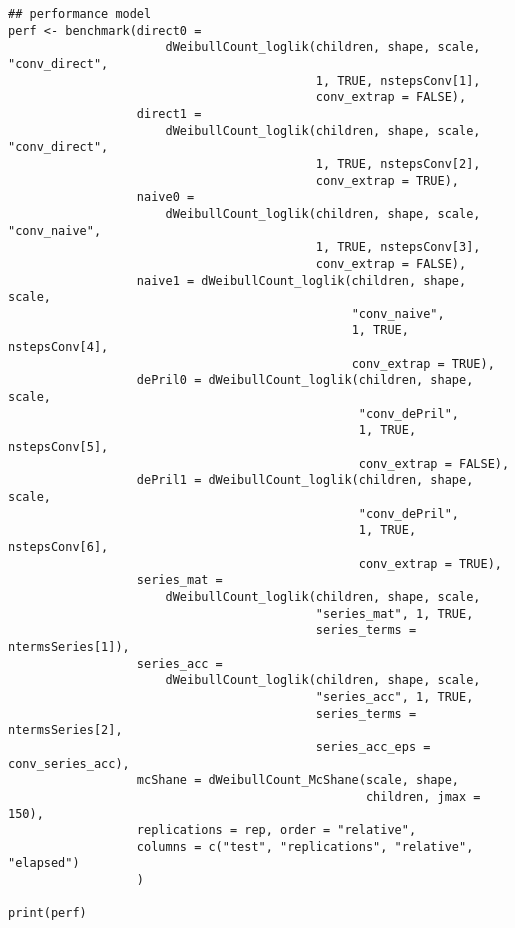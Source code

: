 \documentclass[a4paper,twoside,11pt]{article}
\begin{document}
\begin{verbatim}
## performance model
perf <- benchmark(direct0 =
                      dWeibullCount_loglik(children, shape, scale, "conv_direct",
                                           1, TRUE, nstepsConv[1],
                                           conv_extrap = FALSE),
                  direct1 =
                      dWeibullCount_loglik(children, shape, scale, "conv_direct",
                                           1, TRUE, nstepsConv[2],
                                           conv_extrap = TRUE),
                  naive0 =
                      dWeibullCount_loglik(children, shape, scale, "conv_naive",
                                           1, TRUE, nstepsConv[3],
                                           conv_extrap = FALSE),
                  naive1 = dWeibullCount_loglik(children, shape, scale,
                                                "conv_naive",
                                                1, TRUE, nstepsConv[4],
                                                conv_extrap = TRUE),
                  dePril0 = dWeibullCount_loglik(children, shape, scale,
                                                 "conv_dePril",
                                                 1, TRUE, nstepsConv[5],
                                                 conv_extrap = FALSE),
                  dePril1 = dWeibullCount_loglik(children, shape, scale,
                                                 "conv_dePril",
                                                 1, TRUE, nstepsConv[6],
                                                 conv_extrap = TRUE),
                  series_mat =
                      dWeibullCount_loglik(children, shape, scale,
                                           "series_mat", 1, TRUE,
                                           series_terms = ntermsSeries[1]),
                  series_acc =
                      dWeibullCount_loglik(children, shape, scale,
                                           "series_acc", 1, TRUE,
                                           series_terms = ntermsSeries[2],
                                           series_acc_eps = conv_series_acc),
                  mcShane = dWeibullCount_McShane(scale, shape,
                                                  children, jmax = 150),
                  replications = rep, order = "relative",
                  columns = c("test", "replications", "relative", "elapsed")
                  )

print(perf)
\end{verbatim}
\end{document}

